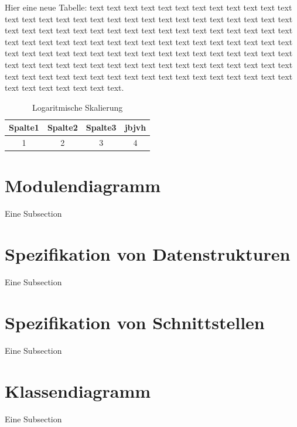 Hier eine neue Tabelle: text text text text text text text text text text text text text text text text text text text text text text text text text text text text text text text text text text text text text text text text text text text text text text text text text text text text text text text text text text text text text text text text text text text text text text text text text text text text text text text text text text text text text text text text text text text text text text text text text text text text text text text text text text text text text text text text text text text text text text text text text.   
            
            \begin{table}[h]
                \begin{tabular}{cccc}
                      \hline
                      Spalte1 & Spalte2 & Spalte3 & jbjvh\\                      
                      \hline
                      1 & 2 & 3 & 4\\
                      \hline
                \end{tabular}
                \centering
                \caption{Logaritmische Skalierung}
                \label{Tab:Logaritmische Skalierung}
            \end{table}
 
        
        
    \section{Modulendiagramm}
        Eine Subsection
	\section{Spezifikation von Datenstrukturen}
        Eine Subsection
	\section{Spezifikation von Schnittstellen}
        Eine Subsection
	\section{Klassendiagramm}
        Eine Subsection
  